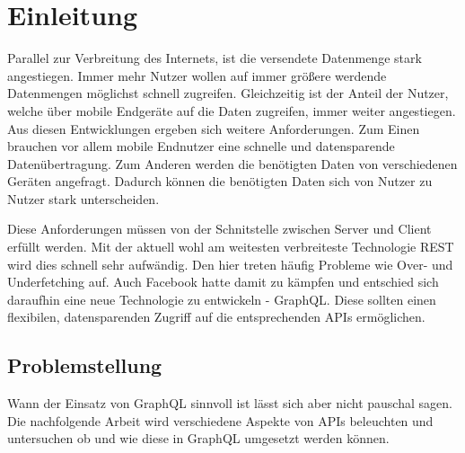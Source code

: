 \chapter{Einleitung}

Parallel zur Verbreitung des Internets, ist die versendete Datenmenge stark angestiegen. Immer mehr Nutzer wollen auf immer größere werdende Datenmengen möglichst schnell zugreifen. Gleichzeitig ist der Anteil der Nutzer, welche über mobile Endgeräte auf die Daten zugreifen, immer weiter angestiegen. \cite{Enge2019}
Aus diesen Entwicklungen ergeben sich weitere Anforderungen. Zum Einen brauchen vor allem mobile Endnutzer eine schnelle und datensparende Datenübertragung. Zum Anderen werden die benötigten Daten von verschiedenen Geräten angefragt. Dadurch können die benötigten Daten sich von Nutzer zu Nutzer stark unterscheiden.

Diese Anforderungen müssen von der Schnitstelle zwischen Server und Client erfüllt werden. Mit der aktuell wohl am weitesten verbreiteste Technologie REST wird dies schnell sehr aufwändig. Den hier treten häufig Probleme wie Over- und Underfetching auf. Auch Facebook hatte damit zu kämpfen und entschied sich daraufhin eine neue Technologie zu entwickeln - GraphQL. Diese sollten einen flexibilen, datensparenden Zugriff auf die entsprechenden APIs ermöglichen. 

\section{Problemstellung}

Wann der Einsatz von GraphQL sinnvoll ist lässt sich aber nicht pauschal sagen. Die nachfolgende Arbeit wird verschiedene Aspekte von APIs beleuchten und untersuchen ob und wie diese in GraphQL umgesetzt werden können. 